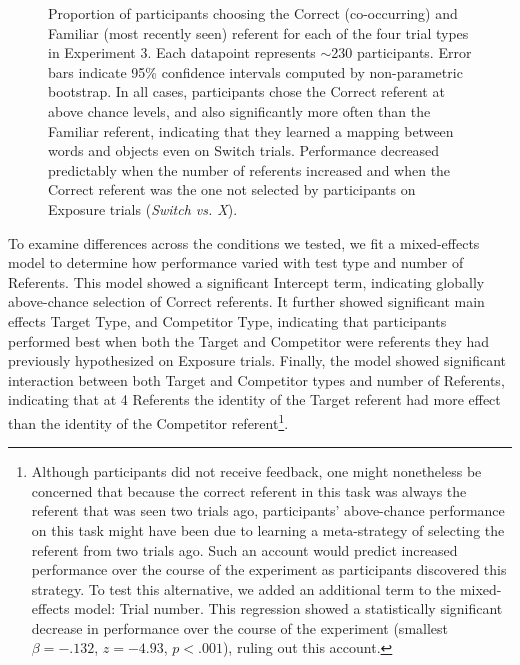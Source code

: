 \documentclass[man,floatsintext]{apa6}
\begin{document}
 \begin{figure}[tb]
	\caption{\label{fig:exp3_data} Proportion of participants choosing the Correct (co-occurring) and Familiar (most recently seen) referent for each of the four trial types in Experiment 3. Each datapoint represents $\sim$230 participants. Error bars indicate 95\% confidence intervals computed by non-parametric bootstrap. In all cases, participants chose the Correct referent at above chance levels, and also significantly more often than the Familiar referent, indicating that they learned a mapping between words and objects even on Switch trials. Performance decreased predictably when the number of referents increased and when the Correct referent was the one not selected by participants on Exposure trials (\emph{Switch vs. X}).}
\end{figure}

To examine differences across the conditions we tested, we fit a mixed-effects model to determine how performance varied with test type and number of Referents. This model showed a significant Intercept term, indicating globally above-chance selection of Correct referents. It further showed significant main effects Target Type, and Competitor Type, indicating that participants performed best when both the Target and Competitor were referents they had previously hypothesized on Exposure trials. Finally, the model showed significant interaction between both Target and Competitor types and number of Referents, indicating that at 4 Referents the identity of the Target referent had more effect than the identity of the Competitor referent\footnote{Although participants did not receive feedback, one might nonetheless be concerned that because the correct referent in this task was always the referent that was seen two trials ago, participants' above-chance performance on this task might have been due to learning a meta-strategy of selecting the referent from two trials ago. Such an account would predict increased performance over the course of the experiment as participants discovered this strategy. To test this alternative, we added an additional term to the mixed-effects model: Trial number. This regression showed a statistically significant decrease in performance over the course of the experiment (smallest $\beta =  -.132$, $z=-4.93$, $p< .001$), ruling out this account.}. 
\end{document}
